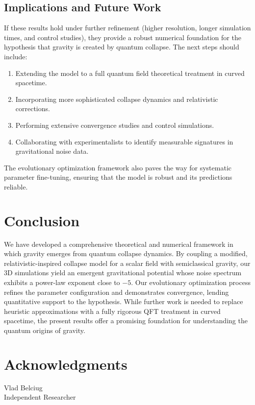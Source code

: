 \documentclass[11pt,a4paper]{article}
\begin{document}
\subsection{Implications and Future Work}
If these results hold under further refinement (higher resolution, longer simulation times, and control studies), they provide a robust numerical foundation for the hypothesis that gravity is created by quantum collapse. The next steps should include:
\begin{enumerate}
    \item Extending the model to a full quantum field theoretical treatment in curved spacetime.
    \item Incorporating more sophisticated collapse dynamics and relativistic corrections.
    \item Performing extensive convergence studies and control simulations.
    \item Collaborating with experimentalists to identify measurable signatures in gravitational noise data.
\end{enumerate}
The evolutionary optimization framework also paves the way for systematic parameter fine-tuning, ensuring that the model is robust and its predictions reliable.

\section{Conclusion}
We have developed a comprehensive theoretical and numerical framework in which gravity emerges from quantum collapse dynamics. By coupling a modified, relativistic-inspired collapse model for a scalar field with semiclassical gravity, our 3D simulations yield an emergent gravitational potential whose noise spectrum exhibits a power-law exponent close to $-5$. Our evolutionary optimization process refines the parameter configuration and demonstrates convergence, lending quantitative support to the hypothesis. While further work is needed to replace heuristic approximations with a fully rigorous QFT treatment in curved spacetime, the present results offer a promising foundation for understanding the quantum origins of gravity.

\section*{Acknowledgments}
Vlad Belciug \\
Independent Researcher
\end{document}

